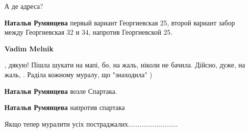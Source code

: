  
 
 
 
 

\qqSecCmt


А де адреса?

\begin{itemize} %
\textbf{Наталья Румянцева} первый вариант Георгиевская 25, второй вариант забор между Георгиевская 32 и 34, напротив Георгиевской 25.

\textbf{Vadim Melnik}

, дякую! Пішла шукати на мапі, бо, на жаль, ніколи не бачила. Дійсно, дуже, на
жаль, . Раділа кожному муралу, що "знаходила" )

\textbf{Наталья Румянцева} возле Спартака.

\textbf{Наталья Румянцева} напротив спартака
\end{itemize} %


Якщо тепер муралити усіх постраджалих..........................

